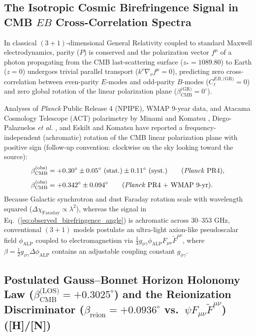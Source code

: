 \documentclass[11pt,a4paper]{article}
\newcommand{\catH}{\textbf{\textcolor{orange!85!black}{[H]}}}
\newcommand{\catN}{\textbf{\textcolor{teal!75!black}{[N]}}}
\theoremstyle{plain}
\theoremstyle{definition}
\theoremstyle{remark}
\numberwithin{equation}{section}
\begin{document}
\subsection{\texorpdfstring{The Isotropic Cosmic Birefringence Signal in CMB $EB$ Cross-Correlation Spectra}{The Isotropic Cosmic Birefringence Signal in CMB EB Cross-Correlation Spectra}}

In classical $(3+1)$-dimensional General Relativity coupled to standard Maxwell electrodynamics, parity ($P$) is conserved and the polarization vector $f^\mu$ of a photon propagating from the CMB last-scattering surface ($z_* = 1089.80$) to Earth ($z = 0$) undergoes trivial parallel transport ($k^\nu \nabla_\nu f^\mu = 0$), predicting zero cross-correlation between even-parity $E$-modes and odd-parity $B$-modes ($C_\ell^{EB, \text{(GR)}} = 0$) and zero global rotation of the linear polarization plane ($\beta_{\text{CMB}}^{\text{(GR)}} = 0^\circ$).

Analyses of \textit{Planck} Public Release 4 (NPIPE), WMAP 9-year data, and Atacama Cosmology Telescope (ACT) polarimetry by Minami and Komatsu \cite{minami2020}, Diego-Palazuelos \textit{et al.} \cite{diego2022}, and Eskilt and Komatsu \cite{eskilt2022,komatsu2022} have reported a frequency-independent (achromatic) rotation of the CMB linear polarization plane with positive sign (follow-up convention: clockwise on the sky looking toward the source):
\begin{align}
\beta_{\text{CMB}}^{\text{(obs)}} &= +0.30^\circ \pm 0.05^\circ\text{ (stat.)} \pm 0.11^\circ\text{ (syst.)} \qquad \text{(\textit{Planck} PR4)}, \nonumber \\[3pt]
\beta_{\text{CMB}}^{\text{(obs)}} &= +0.342^\circ \pm 0.094^\circ \qquad \text{(\textit{Planck} PR4 + WMAP 9-yr)}.
\label{eq:observed_birefringence_angle}
\end{align}
Because Galactic synchrotron and dust Faraday rotation scale with wavelength squared ($\Delta\chi_{\text{Faraday}} \propto \lambda^2$), whereas the signal in Eq.~(\ref{eq:observed_birefringence_angle}) is achromatic across $30\text{--}353\text{ GHz}$, conventional $(3+1)$ models postulate an ultra-light axion-like pseudoscalar field $\phi_{\text{ALP}}$ coupled to electromagnetism via $\frac{1}{4}g_{\phi\gamma}\phi_{\text{ALP}}F_{\mu\nu}\tilde{F}^{\mu\nu}$, where $\beta = \frac{1}{2}g_{\phi\gamma}\Delta\phi_{\text{ALP}}$ contains an adjustable coupling constant $g_{\phi\gamma}$.

\subsection{\texorpdfstring{Postulated Gauss--Bonnet Horizon Holonomy Law ($\beta_{\text{CMB}}^{\text{(LOS)}} = +0.3025^\circ$) and the Reionization Discriminator ($\beta_{\text{reion}} = +0.0936^\circ$ vs.\ $\psi F_{\mu\nu}\tilde{F}^{\mu\nu}$) (\catH/\catN)}{Postulated Gauss-Bonnet Horizon Holonomy Law (+0.3025 deg) and the Reionization Discriminator (+0.0936 deg vs. Axion Coupling) ([H]/[N])}}
\end{document}

